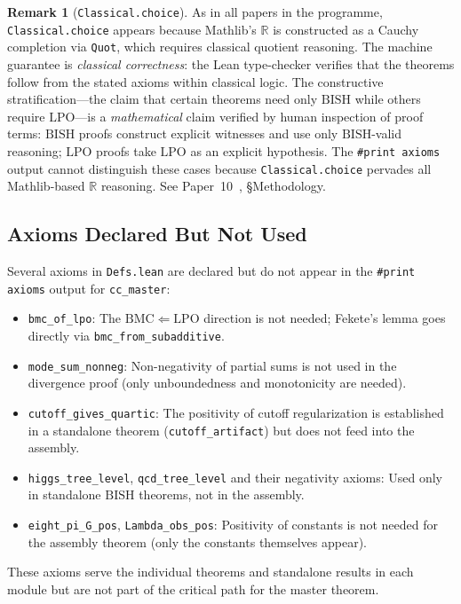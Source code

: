 \documentclass[11pt,a4paper]{article}
\theoremstyle{plain}
\theoremstyle{definition}
\newtheorem{remark}[theorem]{Remark}
\newcommand{\RR}{\mathbb{R}}
\newcommand{\LPO}{\ensuremath{\mathrm{LPO}}}
\newcommand{\BISH}{\ensuremath{\mathrm{BISH}}}
\newcommand{\BMC}{\ensuremath{\mathrm{BMC}}}
\begin{document}
\begin{remark}[\texttt{Classical.choice}]\label{rem:classical-choice}
As in all papers in the programme, \texttt{Classical.choice} appears
because Mathlib's $\RR$ is constructed as a Cauchy completion via
\texttt{Quot}, which requires classical quotient reasoning.
The machine guarantee is \emph{classical correctness}: the Lean
type-checker verifies that the theorems follow from the stated
axioms within classical logic.  The constructive stratification---the
claim that certain theorems need only $\BISH$ while others require
$\LPO$---is a \emph{mathematical} claim verified by human inspection
of proof terms: $\BISH$ proofs construct explicit witnesses and use
only $\BISH$-valid reasoning; $\LPO$ proofs take $\LPO$ as an
explicit hypothesis.  The \texttt{\#print axioms} output cannot
distinguish these cases because \texttt{Classical.choice} pervades
all Mathlib-based $\RR$ reasoning.
See Paper~10~\cite{Lee26P10}, \S Methodology.
\end{remark}

\subsection{Axioms Declared But Not Used}

Several axioms in \texttt{Defs.lean} are declared but do not appear
in the \texttt{\#print axioms} output for \texttt{cc\_master}:
\begin{itemize}[nosep]
\item \texttt{bmc\_of\_lpo}: The $\BMC \Leftarrow \LPO$ direction is
  not needed; Fekete's lemma goes directly via \texttt{bmc\_from\_subadditive}.
\item \texttt{mode\_sum\_nonneg}: Non-negativity of partial sums is not
  used in the divergence proof (only unboundedness and monotonicity are needed).
\item \texttt{cutoff\_gives\_quartic}: The positivity of cutoff regularization
  is established in a standalone theorem (\texttt{cutoff\_artifact}) but does
  not feed into the assembly.
\item \texttt{higgs\_tree\_level}, \texttt{qcd\_tree\_level} and their negativity
  axioms: Used only in standalone $\BISH$ theorems, not in the assembly.
\item \texttt{eight\_pi\_G\_pos}, \texttt{Lambda\_obs\_pos}: Positivity of
  constants is not needed for the assembly theorem (only the constants
  themselves appear).
\end{itemize}
These axioms serve the individual theorems and standalone results in
each module but are not part of the critical path for the master theorem.
\end{document}
